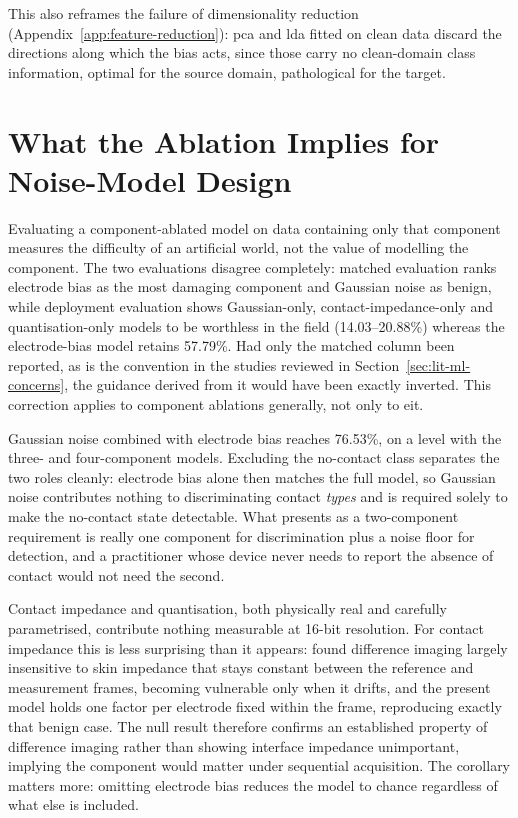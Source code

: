 This also reframes the failure of dimensionality reduction (Appendix~\ref{app:feature-reduction}): \gls{pca} and \gls{lda} fitted on clean data discard the directions along which the bias acts, since those carry no clean-domain class information, optimal for the source domain, pathological for the target.

\section{What the Ablation Implies for Noise-Model Design}
\label{sec:disc-ablation}

Evaluating a component-ablated model on data containing only that component measures the difficulty of an artificial world, not the value of modelling the component. The two evaluations disagree completely: matched evaluation ranks electrode bias as the most damaging component and Gaussian noise as benign, while deployment evaluation shows Gaussian-only, contact-impedance-only and quantisation-only models to be worthless in the field (14.03--20.88\%) whereas the electrode-bias model retains 57.79\%. Had only the matched column been reported, as is the convention in the studies reviewed in Section~\ref{sec:lit-ml-concerns}, the guidance derived from it would have been exactly inverted. This correction applies to component ablations generally, not only to \gls{eit}.

Gaussian noise combined with electrode bias reaches 76.53\%, on a level with the three- and four-component models. Excluding the no-contact class separates the two roles cleanly: electrode bias alone then matches the full model, so Gaussian noise contributes nothing to discriminating contact \emph{types} and is required solely to make the no-contact state detectable. What presents as a two-component requirement is really one component for discrimination plus a noise floor for detection, and a practitioner whose device never needs to report the absence of contact would not need the second.


Contact impedance and quantisation, both physically real and carefully parametrised, contribute nothing measurable at 16-bit resolution. For contact impedance this is less surprising than it appears: \textcite{boone1996} found difference imaging largely insensitive to skin impedance that stays constant between the reference and measurement frames, becoming vulnerable only when it drifts, and the present model holds one factor per electrode fixed within the frame, reproducing exactly that benign case. The null result therefore confirms an established property of difference imaging rather than showing interface impedance unimportant, implying the component would matter under sequential acquisition. The corollary matters more: omitting electrode bias reduces the model to chance regardless of what else is included.


